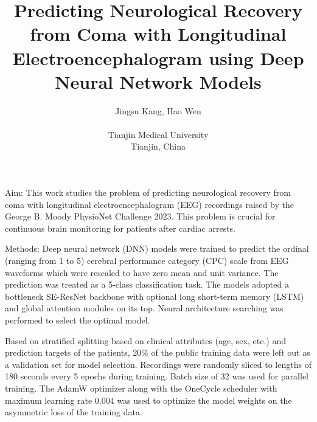 \documentclass{cinc-abstract}
\begin{document}
\title{Predicting Neurological Recovery from Coma with Longitudinal Electroencephalogram using Deep Neural Network Models}

\author {Jingsu Kang, Hao Wen\\ %
\ \\ %
Tianjin Medical University\\  %
Tianjin, China} %

\maketitle



Aim: This work studies the problem of predicting neurological recovery from coma with longitudinal electroencephalogram (EEG) recordings raised by the George B. Moody PhysioNet Challenge 2023. This problem is crucial for continuous brain monitoring for patients after cardiac arrests.

Methods: Deep neural network (DNN) models were trained to predict the ordinal (ranging from 1 to 5) cerebral performance category (CPC) scale from EEG waveforms which were rescaled to have zero mean and unit variance. The prediction was treated as a 5-class classification task. The models adopted a bottleneck SE-ResNet backbone with optional long short-term memory (LSTM) and global attention modules on its top. Neural architecture searching was performed to select the optimal model.

Based on stratified splitting based on clinical attributes (age, sex, etc.) and prediction targets of the patients, 20\% of the public training data were left out as a validation set for model selection. Recordings were randomly sliced to lengths of 180 seconds every 5 epochs during training. Batch size of 32 was used for parallel training. The AdamW optimizer along with the OneCycle scheduler with maximum learning rate 0.004 was used to optimize the model weights on the asymmetric loss of the training data.
\end{document}
